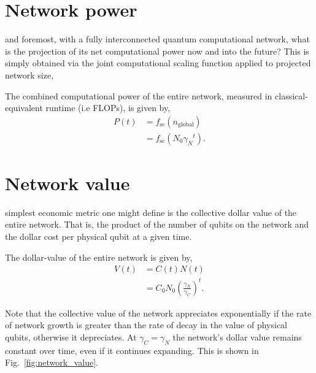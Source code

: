 %
%

\section{Network power}\label{sec:network_power}

 and foremost, with a fully interconnected quantum computational network, what is the projection of its net computational power now and into the future? This is simply obtained via the joint computational scaling function applied to projected network size,

\begin{postulate}\label{post:network_power}
The combined computational power of the entire network, measured in classical-equivalent runtime (i.e FLOPs), is given by,
\begin{align}
P(t) &= f_\mathrm{sc}(n_\mathrm{global})\nonumber \\
&= f_\mathrm{sc}(N_0{\gamma_N}^t).
\end{align}
\end{postulate}

%
%

\section{Network value}\label{sec:network_value}

 simplest economic metric one might define is the collective dollar value of the entire network. That is, the product of the number of qubits on the network and the dollar cost per physical qubit at a given time.

\begin{postulate}\label{post:network_value}
The dollar-value of the entire network is given by,
\begin{align}
	V(t) &= C(t) N(t) \nonumber \\
	&= C_0 N_0 \left(\frac{\gamma_N}{\gamma_C}\right)^t.
\end{align}
\end{postulate}

Note that the collective value of the network appreciates exponentially if the rate of network growth is greater than the rate of decay in the value of physical qubits, otherwise it depreciates. At \mbox{$\gamma_C=\gamma_N$} the network's dollar value remains constant over time, even if it continues expanding. This is shown in Fig.~\ref{fig:network_value}.


